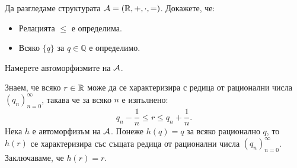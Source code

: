 \begin{problem}
  Да разгледаме структурата $\mathcal{A} = (\mathbb{R}, +, \cdot, =)$.
  Докажете, че:
  \begin{itemize}
  \item
    Релацията $\leq$ е определима.
  \item
    Всяко $\{q\}$ за $q \in \mathbb{Q}$ е определимо.
  \end{itemize}
  Намерете автоморфизмите на $\mathcal{A}$.
\end{problem}
\begin{hint}
  Знаем, че всяко $r \in \mathbb{R}$ може да се характеризира с редица от рационални числа $(q_n)^\infty_{n=0}$, такава че
  за всяко $n$ е изпълнено:
  \[ q_n - \frac{1}{n} \leq r \leq q_n + \frac{1}{n}.\]
  Нека $h$ е автоморфизъм на $\mathcal{A}$. Понеже $h(q) = q$ за всяко рационално $q$, то
  $h(r)$ се характеризира със същата редица от рационални числа $(q_n)^{\infty}_{n=0}$.
  Заключаваме, че $h(r) = r$.
\end{hint}



